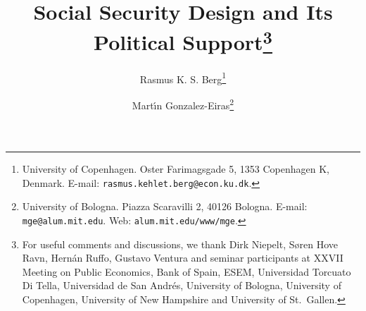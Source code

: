 \title{Social Security Design and Its Political Support\thanks{For useful comments and discussions, we thank Dirk Niepelt, S\o ren Hove Ravn, Hern\'an Ruffo, Gustavo Ventura and seminar participants at XXVII Meeting on Public Economics, Bank of Spain, ESEM, Universidad Torcuato Di Tella, Universidad de San Andr\'es, University of Bologna, University of Copenhagen, University of New Hampshire and University of St.\ Gallen.}}

\author{Rasmus K. S. Berg\thanks{University of Copenhagen. Oster Farimagsgade 5, 1353 Copenhagen K, Denmark. E-mail: \texttt{rasmus.kehlet.berg@econ.ku.dk}.}
\and
Mart\'{\i}n Gonzalez-Eiras\thanks{University of Bologna. Piazza Scaravilli 2, 40126 Bologna. E-mail: \texttt{mge@alum.mit.edu}. Web: \texttt{alum.mit.edu/www/mge}.}}
\maketitle
